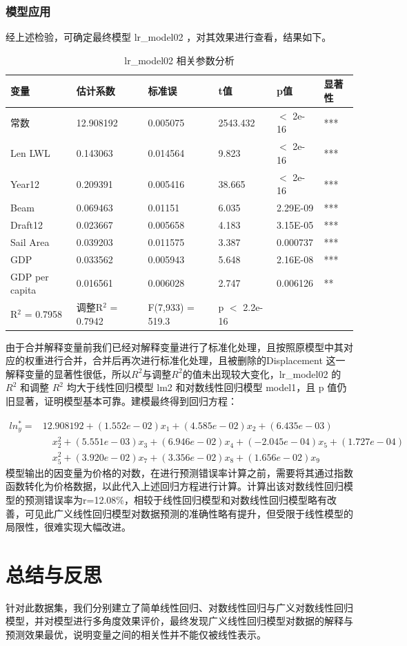 \documentclass[a4paper,12pt,onecolumn,oneside]{article}
\begin{document}
\subsubsection{模型应用}
经上述检验，可确定最终模型 lr\_model02 ，对其效果进行查看，结果如下。\par 
\begin{table}[h]
	\centering
	\caption{lr\_model02 相关参数分析}\vspace{0.25\baselineskip}
	\label{tab:lr_model02}
	\begin{tabular}{llllll}
		\hline
		变量 & 估计系数 & 标准误 & t值 & p值 & 显著性 \\ \hline
		常数 & 12.908192 & 0.005075 & 2543.432 & $<$ 2e-16 & *** \\
		Len LWL & 0.143063 & 0.014564 & 9.823 & $<$ 2e-16 & *** \\
		Year12 & 0.209391 & 0.005416 & 38.665 & $<$ 2e-16 & *** \\
		Beam & 0.069463 & 0.01151 & 6.035 & 2.29E-09 & *** \\
		Draft12 & 0.023667 & 0.005658 & 4.183 & 3.15E-05 & *** \\
		Sail Area & 0.039203 & 0.011575 & 3.387 & 0.000737 & *** \\
		GDP & 0.033562 & 0.005943 & 5.648 & 2.16E-08 & *** \\
		GDP per capita & 0.016561 & 0.006028 & 2.747 & 0.006126 & ** \\ \hline
		R$^2$ = 0.7958 & 调整R$^2$ = 0.7942 & F(7,933) = 519.3 & p $<$ 2.2e-16 & & \\ \hline
	\end{tabular}
\end{table}
由于合并解释变量前我们已经对解释变量进行了标准化处理，且按照原模型中其对应的权重进行合并，合并后再次进行标准化处理，且被删除的Displacement 这一解释变量的显著性很低，所以$R^2$与调整$R^2$的值未出现较大变化，lr\_model02 的 $R^2$ 和调整 $R^2$ 均大于线性回归模型 lm2 和对数线性回归模型 model1，且 p 值仍旧显著，证明模型基本可靠。建模最终得到回归方程：\par 
\begin{align}
	ln_y^{*}= &12.908192+(1.552e-02) x_1+(4.585e-02) x_2+(6.435e-03) \nonumber \\
	&\quad x_2^2+(5.551e-03) x_3+(6.946e-02) x_4+(-2.045e-04) x_5+(1.727e-04) \nonumber \\
	&\quad x_5^2+(3.920e-02) x_7+(3.356e-02) x_8+(1.656e-02) x_9
\end{align}
模型输出的因变量为价格的对数，在进行预测错误率计算之前，需要将其通过指数函数转化为价格数据，以此代入上述回归方程进行计算。计算出该对数线性回归模型的预测错误率为r=12.08\%，相较于线性回归模型和对数线性回归模型略有改善，可见此广义线性回归模型对数据预测的准确性略有提升，但受限于线性模型的局限性，很难实现大幅改进。
\section{总结与反思}
针对此数据集，我们分别建立了简单线性回归、对数线性回归与广义对数线性回归模型，并对模型进行多角度效果评价，最终发现广义线性回归模型对数据的解释与预测效果最优，说明变量之间的相关性并不能仅被线性表示。
\end{document}
